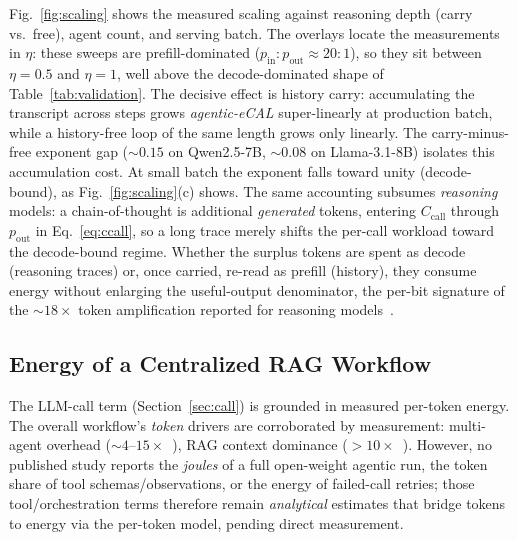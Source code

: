 \documentclass[journal]{IEEEtran}
\newif\ifshowchanges \showchangestrue
\newcommand{\NEW}{\ifshowchanges\color{blue}\fi}
\newcommand{\OLD}{\ifshowchanges\color{black}\fi}
\newcommand{\reasoningBlow}{$\sim\!18\times$}  %
\newcommand{\agecal}{\textit{agentic-eCAL}}
\begin{document}
Fig.~\ref{fig:scaling} shows the measured scaling against reasoning depth (carry
vs.\ free), agent count, and serving batch. \NEW{}The overlays locate the measurements in $\eta$:
these sweeps are prefill-dominated ($p_{\mathrm{in}}\!:\!p_{\mathrm{out}}\approx20\!:\!1$), so they
sit between $\eta=0.5$ and $\eta=1$, well above the decode-dominated shape of
Table~\ref{tab:validation}.\OLD{} The decisive effect is history carry: accumulating the transcript across steps grows \agecal{}
super-linearly at production batch, while a history-free loop of the same length grows only linearly.
The carry-minus-free exponent gap ($\sim\!0.15$ on Qwen2.5-7B, $\sim\!0.08$ on Llama-3.1-8B) isolates
this accumulation cost. \NEW{}At small batch the exponent falls toward unity (decode-bound), as
Fig.~\ref{fig:scaling}(c) shows.\OLD{} The same accounting subsumes \emph{reasoning} models: a chain-of-thought is additional
\emph{generated} tokens, \NEW{}entering $C_{\mathrm{call}}$ through $p_{\mathrm{out}}$ in
Eq.~\eqref{eq:ccall}\OLD{}, so a
long trace merely shifts the per-call workload toward the decode-bound regime. Whether the surplus tokens are spent as decode (reasoning traces) or, once carried,
re-read as prefill (history), they consume energy without enlarging the useful-output
denominator, the per-bit signature of the \reasoningBlow{} token amplification reported for reasoning
models~\cite{llmthinkbench2025}.



\subsection{Energy of a Centralized RAG Workflow}
The LLM-call term (Section~\ref{sec:call}) is grounded in measured per-token
energy. The overall workflow's \emph{token} drivers are corroborated by measurement: multi-agent
overhead ($\sim\!4$--$15\times$~\cite{anthropic_multiagent}), RAG context dominance
($>\!10\times$~\cite{ragcache2024}). However, no published study reports the \emph{joules} of a full
open-weight agentic run, the token share of tool schemas/observations, or the energy of failed-call
retries; those tool/orchestration terms therefore remain \emph{analytical} estimates that bridge
tokens to energy via the per-token model, pending direct measurement.
\end{document}
